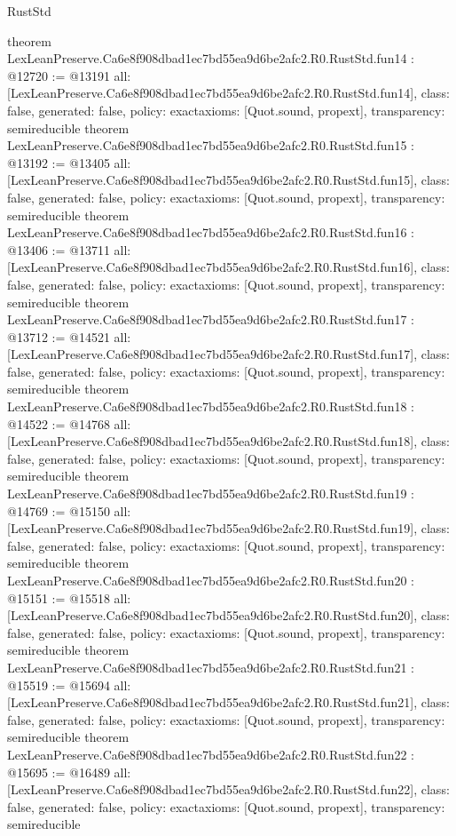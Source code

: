 \begin{lexlean}{RustStd}
\begin{coremodule}
{}
theorem LexLeanPreserve.Ca6e8f908dbad1ec7bd55ea9d6be2afc2.R0.RustStd.fun14 : @12720 := @13191 {
  all: [LexLeanPreserve.Ca6e8f908dbad1ec7bd55ea9d6be2afc2.R0.RustStd.fun14],
  class: false,
  generated: false,
  policy: exact{axioms: [Quot.sound, propext]},
  transparency: semireducible
}
theorem LexLeanPreserve.Ca6e8f908dbad1ec7bd55ea9d6be2afc2.R0.RustStd.fun15 : @13192 := @13405 {
  all: [LexLeanPreserve.Ca6e8f908dbad1ec7bd55ea9d6be2afc2.R0.RustStd.fun15],
  class: false,
  generated: false,
  policy: exact{axioms: [Quot.sound, propext]},
  transparency: semireducible
}
theorem LexLeanPreserve.Ca6e8f908dbad1ec7bd55ea9d6be2afc2.R0.RustStd.fun16 : @13406 := @13711 {
  all: [LexLeanPreserve.Ca6e8f908dbad1ec7bd55ea9d6be2afc2.R0.RustStd.fun16],
  class: false,
  generated: false,
  policy: exact{axioms: [Quot.sound, propext]},
  transparency: semireducible
}
theorem LexLeanPreserve.Ca6e8f908dbad1ec7bd55ea9d6be2afc2.R0.RustStd.fun17 : @13712 := @14521 {
  all: [LexLeanPreserve.Ca6e8f908dbad1ec7bd55ea9d6be2afc2.R0.RustStd.fun17],
  class: false,
  generated: false,
  policy: exact{axioms: [Quot.sound, propext]},
  transparency: semireducible
}
theorem LexLeanPreserve.Ca6e8f908dbad1ec7bd55ea9d6be2afc2.R0.RustStd.fun18 : @14522 := @14768 {
  all: [LexLeanPreserve.Ca6e8f908dbad1ec7bd55ea9d6be2afc2.R0.RustStd.fun18],
  class: false,
  generated: false,
  policy: exact{axioms: [Quot.sound, propext]},
  transparency: semireducible
}
theorem LexLeanPreserve.Ca6e8f908dbad1ec7bd55ea9d6be2afc2.R0.RustStd.fun19 : @14769 := @15150 {
  all: [LexLeanPreserve.Ca6e8f908dbad1ec7bd55ea9d6be2afc2.R0.RustStd.fun19],
  class: false,
  generated: false,
  policy: exact{axioms: [Quot.sound, propext]},
  transparency: semireducible
}
theorem LexLeanPreserve.Ca6e8f908dbad1ec7bd55ea9d6be2afc2.R0.RustStd.fun20 : @15151 := @15518 {
  all: [LexLeanPreserve.Ca6e8f908dbad1ec7bd55ea9d6be2afc2.R0.RustStd.fun20],
  class: false,
  generated: false,
  policy: exact{axioms: [Quot.sound, propext]},
  transparency: semireducible
}
theorem LexLeanPreserve.Ca6e8f908dbad1ec7bd55ea9d6be2afc2.R0.RustStd.fun21 : @15519 := @15694 {
  all: [LexLeanPreserve.Ca6e8f908dbad1ec7bd55ea9d6be2afc2.R0.RustStd.fun21],
  class: false,
  generated: false,
  policy: exact{axioms: [Quot.sound, propext]},
  transparency: semireducible
}
theorem LexLeanPreserve.Ca6e8f908dbad1ec7bd55ea9d6be2afc2.R0.RustStd.fun22 : @15695 := @16489 {
  all: [LexLeanPreserve.Ca6e8f908dbad1ec7bd55ea9d6be2afc2.R0.RustStd.fun22],
  class: false,
  generated: false,
  policy: exact{axioms: [Quot.sound, propext]},
  transparency: semireducible
}
\end{coremodule}
\end{lexlean}
